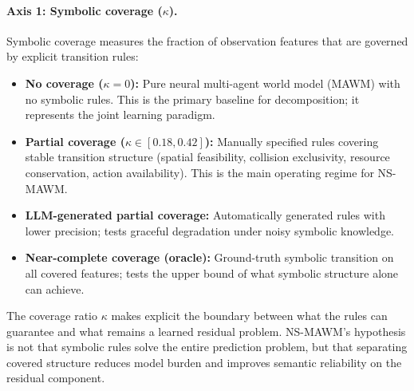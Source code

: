 \documentclass{article}
\theoremstyle{plain}
\theoremstyle{definition}
\theoremstyle{remark}
\begin{document}
\paragraph{Axis 1: Symbolic coverage ($\kappa$).}
Symbolic coverage measures the fraction of observation features that are governed by explicit transition rules:
\begin{itemize}
  \item \textbf{No coverage ($\kappa=0$):} Pure neural multi-agent world model (MAWM) with no symbolic rules. This is the primary baseline for decomposition; it represents the joint learning paradigm.
  \item \textbf{Partial coverage ($\kappa \in [0.18, 0.42]$):} Manually specified rules covering stable transition structure (spatial feasibility, collision exclusivity, resource conservation, action availability). This is the main operating regime for NS-MAWM.
  \item \textbf{LLM-generated partial coverage:} Automatically generated rules with lower precision; tests graceful degradation under noisy symbolic knowledge.
  \item \textbf{Near-complete coverage (oracle):} Ground-truth symbolic transition on all covered features; tests the upper bound of what symbolic structure alone can achieve.
\end{itemize}

The coverage ratio $\kappa$ makes explicit the boundary between what the rules can guarantee and what remains a learned residual problem. NS-MAWM's hypothesis is not that symbolic rules solve the entire prediction problem, but that separating covered structure reduces model burden and improves semantic reliability on the residual component.
\end{document}

